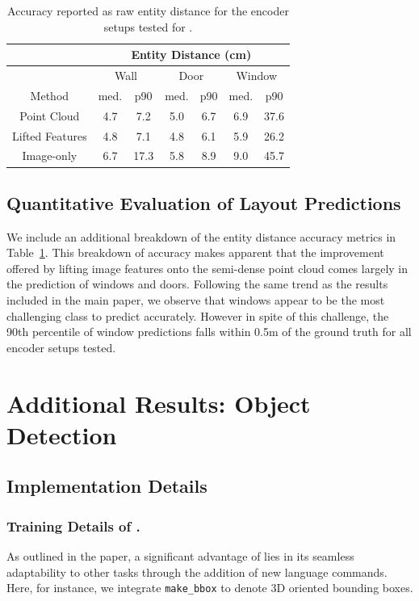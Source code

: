 \begin{table}
\centering
    \caption{
    Accuracy reported as raw entity distance for the encoder setups tested for \METHOD. 
    }
\begin{tabular}{c|cc|cc|cc}
        & \multicolumn{6}{c}{Entity Distance (cm)} \\
        \hline
         & \multicolumn{2}{c|}{Wall} & \multicolumn{2}{c|}{Door} & \multicolumn{2}{c}{Window}\\
        Method & med. & p90 & med. & p90 & med. & p90 \\
        \hline \hline
        Point Cloud &       4.7 & 7.2   & 5.0 & 6.7     & 6.9 & 37.6 \\
        Lifted Features &   4.8 & 7.1   & 4.8 & 6.1     & 5.9 & 26.2  \\
        Image-only &        6.7 & 17.3  & 5.8 & 8.9     & 9.0 & 45.7 \\
    \end{tabular}
    \label{table:plane_distances}
\end{table}
\subsection{Quantitative Evaluation of Layout Predictions}
\label{app:per_entity}

We include an additional breakdown of the entity distance accuracy metrics in Table~\ref{table:plane_distances}. 
This breakdown of accuracy makes apparent that the improvement offered by lifting image features onto the semi-dense point cloud comes largely in the prediction of windows and doors.
Following the same trend as the results included in the main paper, we observe that windows appear to be the most challenging class to predict accurately. 
However in spite of this challenge, the 90th percentile of window predictions falls within 0.5m of the ground truth for all encoder setups tested.





\section{Additional Results: Object Detection}

\subsection{Implementation Details}
\subsubsection{Training Details of \METHOD{}.}
%
As outlined in the paper, a significant advantage of \METHOD{} lies in its seamless adaptability to other tasks through the addition of new language commands. Here, for instance, we integrate \texttt{make\_bbox} to denote 3D oriented bounding boxes.

